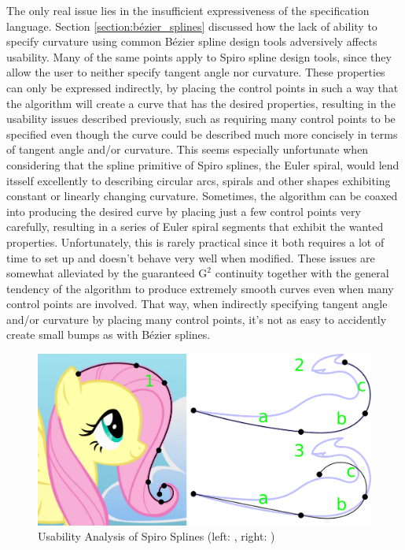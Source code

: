 \documentclass[a4paper]{article}
\begin{document}
				The only real issue lies in the insufficient expressiveness of the specification language. Section \ref{section:bézier_splines} discussed how the lack of ability to specify curvature using common Bézier spline design tools adversively affects usability. Many of the same points apply to Spiro spline design tools, since they allow the user to neither specify tangent angle nor curvature. These properties can only be expressed indirectly, by placing the control points in such a way that the algorithm will create a curve that has the desired properties, resulting in the usability issues described previously, such as requiring many control points to be specified even though the curve could be described much more concisely in terms of tangent angle and/or curvature. This seems especially unfortunate when considering that the spline primitive of Spiro splines, the Euler spiral, would lend itsself excellently to describing circular arcs, spirals and other shapes exhibiting constant or linearly changing curvature. Sometimes, the algorithm can be coaxed into producing the desired curve by placing just a few control points very carefully, resulting in a series of Euler spiral segments that exhibit the wanted properties. Unfortunately, this is rarely practical since it both requires a lot of time to set up and doesn't behave very well when modified. These issues are somewhat alleviated by the guaranteed \(\mathrm{G}^2\) continuity together with the general tendency of the algorithm to produce extremely smooth curves even when many control points are involved. That way, when indirectly specifying tangent angle and/or curvature by placing many control points, it's not as easy to accidently create small bumps as with Bézier splines.

				\begin{figure}[htb]
					\centering
					\includegraphics[width=\textwidth]{../resources/usability_spiro.pdf}
					\caption{Usability Analysis of Spiro Splines (left: \cite{Fluttershy}, right: \cite{Lugia})}
					\label{figure:usability_spiro}
				\end{figure}
\end{document}
